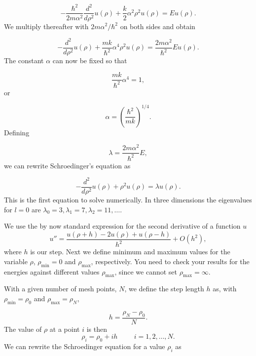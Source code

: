 \documentclass[%
oneside,                 %
final,                   %
10pt]{article}
\begin{document}
\begin{equation*}
  -\frac{\hbar^2}{2 m \alpha^2} \frac{d^2}{d\rho^2} u(\rho) 
       + \frac{k}{2} \alpha^2\rho^2u(\rho)  = E u(\rho) .
\end{equation*}
We multiply thereafter with $2m\alpha^2/\hbar^2$ on both sides and obtain

\begin{equation*}
  -\frac{d^2}{d\rho^2} u(\rho) 
       + \frac{mk}{\hbar^2} \alpha^4\rho^2u(\rho)  = \frac{2m\alpha^2}{\hbar^2}E u(\rho) .
\end{equation*}
The constant $\alpha$ can now be fixed
so that

\begin{equation*}
\frac{mk}{\hbar^2} \alpha^4 = 1,
\end{equation*}
or

\begin{equation*}
\alpha = \left(\frac{\hbar^2}{mk}\right)^{1/4}.
\end{equation*}
Defining

\begin{equation*}
\lambda = \frac{2m\alpha^2}{\hbar^2}E,
\end{equation*}
we can rewrite Schroedinger's equation as

\begin{equation*}
  -\frac{d^2}{d\rho^2} u(\rho) + \rho^2u(\rho)  = \lambda u(\rho) .
\end{equation*}
This is the first equation to solve numerically. In three dimensions 
the eigenvalues for $l=0$ are 
$\lambda_0=3,\lambda_1=7,\lambda_2=11,\dots .$

We use the by now standard
expression for the second derivative of a function $u$
\begin{equation}
    u''=\frac{u(\rho+h) -2u(\rho) +u(\rho-h)}{h^2} +O(h^2),
    \label{eq:diffoperation}
\end{equation}
where $h$ is our step.
Next we define minimum and maximum values for the variable $\rho$,
$\rho_{\mathrm{min}}=0$  and $\rho_{\mathrm{max}}$, respectively.
You need to check your results for the energies against different values
$\rho_{\mathrm{max}}$, since we cannot set
$\rho_{\mathrm{max}}=\infty$. 

With a given number of mesh points, $N$, we 
define the step length $h$ as, with $\rho_{\mathrm{min}}=\rho_0$  and $\rho_{\mathrm{max}}=\rho_N$,

\begin{equation*}
  h=\frac{\rho_N-\rho_0 }{N}.
\end{equation*}
The value of $\rho$ at a point $i$ is then 
\[
    \rho_i= \rho_0 + ih \hspace{1cm} i=1,2,\dots , N.
\]
We can rewrite the Schroedinger equation for a value $\rho_i$ as
\end{document}
